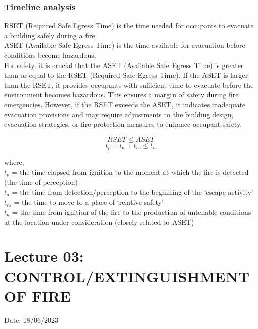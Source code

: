 \documentclass{article}
\begin{document}
\subsubsection*{Timeline analysis}
RSET (Required Safe Egress Time) is the time needed for occupants to evacuate a building safely during a fire. \\

ASET (Available Safe Egress Time) is the time available for evacuation before conditions become hazardous. \\

For safety, it is crucial that the ASET (Available Safe Egress Time) is greater than or equal to the RSET (Required Safe Egress Time). If the ASET is larger than the RSET, it provides occupants with sufficient time to evacuate before the environment becomes hazardous. This ensures a margin of safety during fire emergencies. However, if the RSET exceeds the ASET, it indicates inadequate evacuation provisions and may require adjustments to the building design, evacuation strategies, or fire protection measures to enhance occupant safety. 

$$RSET \leq  ASET$$
$$t_p + t_a + t_{rs} \leq t_u$$

where, \\$t_p$ = the time elapsed from ignition to the moment at which the fire is detected (the time of perception)\\
$t_a$ =  the time from detection/perception to the beginning of the ‘escape activity’\\
$t_{rs}$ = the time to move to a place of ‘relative safety’\\
$t_u$ = the time from ignition of the fire to the production of untenable conditions at the location under consideration (closely related to ASET)

\section{Lecture 03: CONTROL/EXTINGUISHMENT OF FIRE} 
\hfill Date: 18/06/2023
\end{document}
